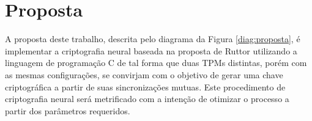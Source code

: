 \documentclass[12pt]{article}
\begin{document}
  
    \section{Proposta}
    \label{sec:proposta}
    
        
        
        A proposta deste trabalho, descrita pelo diagrama da Figura \ref{diag:proposta}, é implementar a criptografia neural baseada na proposta de Ruttor \cite{ruttor2007neural} utilizando a linguagem de programação C de tal forma que duas TPMs distintas, porém com as mesmas configurações, se convirjam com o objetivo de gerar uma chave criptográfica a partir de suas sincronizações mutuas. Este procedimento de criptografia neural será metrificado com a intenção de otimizar o processo a partir dos parâmetros requeridos.
        
    
                
                
                
\end{document}
